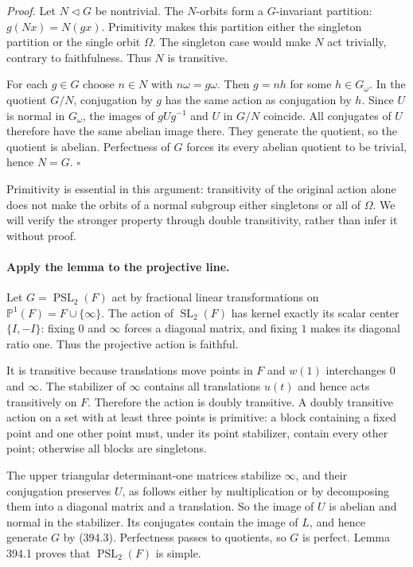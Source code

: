 \documentclass[11pt]{article}
\begin{document}
\emph{Proof.} Let $N\triangleleft G$ be nontrivial. The $N$-orbits
form a $G$-invariant partition: $g(Nx)=N(gx)$. Primitivity makes this
partition either the singleton partition or the single orbit $\Omega$.
The singleton case would make $N$ act trivially, contrary to faithfulness.
Thus $N$ is transitive.

For each $g\in G$ choose $n\in N$ with $n\omega=g\omega$. Then
$g=nh$ for some $h\in G_\omega$. In the quotient $G/N$, conjugation
by $g$ has the same action as conjugation by $h$. Since $U$ is normal
in $G_\omega$, the images of $gUg^{-1}$ and $U$ in $G/N$ coincide.
All conjugates of $U$ therefore have the same abelian image there.
They generate the quotient, so the quotient is abelian. Perfectness
of $G$ forces its every abelian quotient to be trivial, hence $N=G$.
\hfill$\square$

Primitivity is essential in this argument: transitivity of the original
action alone does not make the orbits of a normal subgroup either
singletons or all of $\Omega$. We will verify the stronger property
through double transitivity, rather than infer it without proof.

\paragraph{Apply the lemma to the projective line.}
Let $G=\operatorname{PSL}_2(F)$ act by fractional linear transformations
on $\mathbb P^1(F)=F\cup\{\infty\}$. The action of
$\operatorname{SL}_2(F)$ has kernel exactly its scalar center
$\{I,-I\}$: fixing $0$ and $\infty$ forces a diagonal matrix, and
fixing $1$ makes its diagonal ratio one. Thus the projective action
is faithful.

It is transitive because translations move points in $F$ and $w(1)$
interchanges $0$ and $\infty$. The stabilizer of $\infty$ contains
all translations $u(t)$ and hence acts transitively on $F$. Therefore
the action is doubly transitive. A doubly transitive action on a set
with at least three points is primitive: a block containing a fixed
point and one other point must, under its point stabilizer, contain
every other point; otherwise all blocks are singletons.

The upper triangular determinant-one matrices stabilize $\infty$,
and their conjugation preserves $U$, as follows either by multiplication
or by decomposing them into a diagonal matrix and a translation.
So the image of $U$ is abelian and normal in the stabilizer. Its
conjugates contain the image of $L$, and hence generate $G$ by
(394.3). Perfectness passes to quotients, so $G$ is perfect.
Lemma 394.1 proves that $\operatorname{PSL}_2(F)$ is simple.
\end{document}
